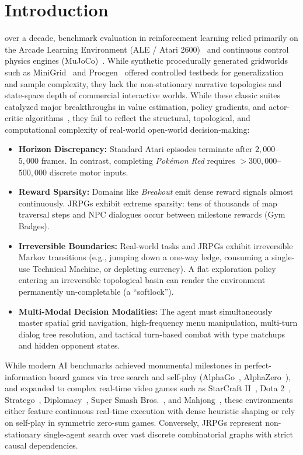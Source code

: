 \documentclass[journal,10pt,twocolumn]{IEEEtran}
\begin{document}
\section{Introduction}
 over a decade, benchmark evaluation in reinforcement learning relied primarily on the Arcade Learning Environment (ALE / Atari 2600)~\cite{bellemare2013ale,mnih2015dqn,hessel2018rainbow} and continuous control physics engines (MuJoCo)~\cite{schulman2017ppo,haarnoja2018sac}. While synthetic procedurally generated gridworlds such as MiniGrid~\cite{chevalier2023minigrid} and Procgen~\cite{cobbe2020procgen} offered controlled testbeds for generalization and sample complexity, they lack the non-stationary narrative topologies and state-space depth of commercial interactive worlds. While these classic suites catalyzed major breakthroughs in value estimation, policy gradients, and actor-critic algorithms~\cite{mnih2016a3c,schulman2015trpo}, they fail to reflect the structural, topological, and computational complexity of real-world open-world decision-making:
\begin{itemize}
    \item \textbf{Horizon Discrepancy:} Standard Atari episodes terminate after $2{,}000$--$5{,}000$ frames. In contrast, completing \textit{Pok{\'e}mon Red} requires $>300{,}000$--$500{,}000$ discrete motor inputs.
    \item \textbf{Reward Sparsity:} Domains like \textit{Breakout} emit dense reward signals almost continuously. JRPGs exhibit extreme sparsity: tens of thousands of map traversal steps and NPC dialogues occur between milestone rewards (Gym Badges).
    \item \textbf{Irreversible Boundaries:} Real-world tasks and JRPGs exhibit irreversible Markov transitions (e.g., jumping down a one-way ledge, consuming a single-use Technical Machine, or depleting currency). A flat exploration policy entering an irreversible topological basin can render the environment permanently un-completable (a ``softlock'').
    \item \textbf{Multi-Modal Decision Modalities:} The agent must simultaneously master spatial grid navigation, high-frequency menu manipulation, multi-turn dialog tree resolution, and tactical turn-based combat with type matchups and hidden opponent states.
\end{itemize}

While modern AI benchmarks achieved monumental milestones in perfect-information board games via tree search and self-play (AlphaGo~\cite{silver2016mastering}, AlphaZero~\cite{silver2017mastering}), and expanded to complex real-time video games such as StarCraft II~\cite{vinyals2019alphastar}, Dota 2~\cite{berner2019dota}, Stratego~\cite{perolat2022mastering}, Diplomacy~\cite{bakhtin2022human}, Super Smash Bros.~\cite{firoiu2017smash}, and Mahjong~\cite{ye2020mastering}, these environments either feature continuous real-time execution with dense heuristic shaping or rely on self-play in symmetric zero-sum games. Conversely, JRPGs represent non-stationary single-agent search over vast discrete combinatorial graphs with strict causal dependencies.
\end{document}
